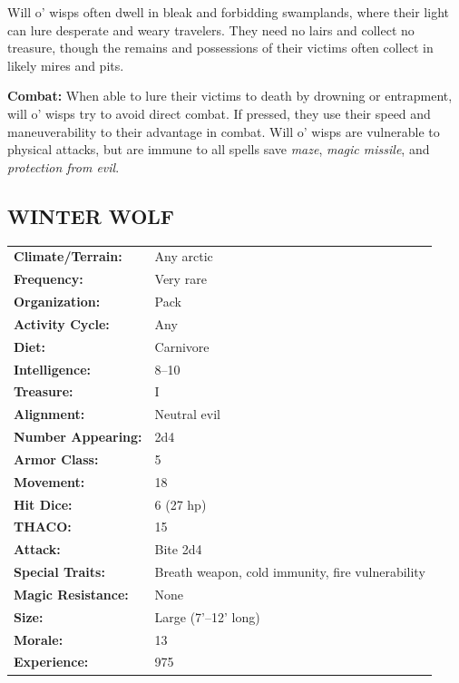 \begin{multicols}{2}
Will o' wisps often dwell in bleak and forbidding swamplands, where their light can lure desperate and weary travelers. They need no lairs and collect no treasure, though the remains and possessions of their victims often collect in likely mires and pits.

\textbf{Combat:} When able to lure their victims to death by drowning or entrapment, will o' wisps try to avoid direct combat. If pressed, they use their speed and maneuverability to their advantage in combat. Will o' wisps are vulnerable to physical attacks, but are immune to all spells save \textit{maze}, \textit{magic missile}, and \textit{protection from evil}. 

\noindent
\begin{minipage}{\columnwidth}

\vspace{1em}

\subsection{WINTER WOLF}

\noindent \begin{tabular}{p{}p{}}
\textbf{Climate/Terrain:}	& Any arctic	\\
\textbf{Frequency:} 		& Very rare	\\
\textbf{Organization:} 		& Pack	\\
\textbf{Activity Cycle:} 	& Any	\\
\textbf{Diet:} 				& Carnivore	\\
\textbf{Intelligence:} 		& 8--10	\\
\textbf{Treasure:} 			& I	\\
\textbf{Alignment:} 		& Neutral evil	\\
\hline
\textbf{Number Appearing:} 	& 2d4	\\
\textbf{Armor Class:} 		& 5	\\
\textbf{Movement:} 			& 18	\\
\textbf{Hit Dice:} 			& 6 (27 hp)	\\
\textbf{THACO:} 			& 15	\\
\textbf{Attack:} 			& Bite 2d4	\\
\textbf{Special Traits:} & Breath weapon, cold immunity, fire vulnerability	\\
\textbf{Magic Resistance:} 	& None	\\
\textbf{Size:} 				& Large (7'--12' long)	\\
\textbf{Morale:} 			& 13	\\
\textbf{Experience:} 		& 975	\\
\end{tabular}


\end{minipage}
\end{multicols}
